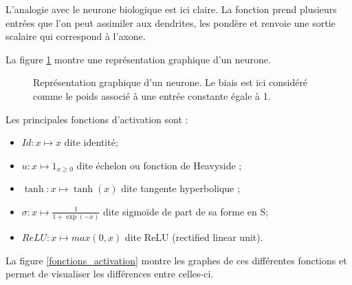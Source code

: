 L'analogie avec le neurone biologique est ici claire. La fonction prend plusieurs entrées que l'on peut assimiler aux dendrites, les pondère et renvoie une sortie scalaire qui correspond à l'axone.

La figure \ref{neurone} montre une représentation graphique d'un neurone.

\begin{figure}
\begin{center}

\caption{Représentation graphique d'un neurone. Le biais est ici considéré comme le poids associé à une entrée constante égale à 1.}
\label{neurone}
\end{center}
\end{figure}

Les principales fonctions d'activation sont : 

\begin{itemize}
\item $Id : x \mapsto x$ dite identité;
\item $u : x \mapsto 1_{x \geq 0}$ dite échelon ou fonction de Heavyside ;
\item $\tanh : x \mapsto \tanh(x)$ dite tangente hyperbolique ;
\item $\sigma : x \mapsto \frac{1}{1+\exp(-x)}$ dite sigmoïde de part de sa forme en S;
\item $ReLU : x \mapsto max(0, x)$ dite ReLU (rectified linear unit).
\end{itemize}

La figure \ref{fonctions_activation} montre les graphes de ces différentes fonctions et permet de visualiser les différences entre celles-ci.

